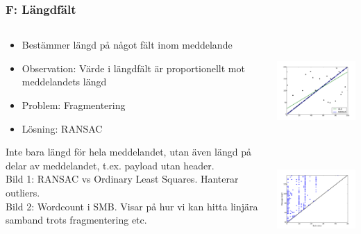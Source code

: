 \documentclass[xetex, 8pt]{beamer}
\begin{document}
    \begin{frame}
        \frametitle{F: Längdfält}
        \begin{columns}[t]
            \begin{column}[T]{6cm}
                \begin{itemize}
                    \item Bestämmer längd på något fält inom meddelande
                    \item Observation: Värde i längdfält är proportionellt
                        mot meddelandets längd
                    \item Problem: Fragmentering
                    \item Lösning: RANSAC
                \end{itemize}
                Inte bara längd för hela meddelandet, utan även längd på delar
                av meddelandet, t.ex. payload utan header.\\
                \vskip20pt
                Bild 1: RANSAC vs Ordinary Least Squares. Hanterar outliers.\\
                \vskip20pt
                Bild 2: Wordcount i SMB. Visar på hur vi kan hitta linjära
                samband trots fragmentering etc.
            \end{column}
            \begin{column}[T]{6cm}
                \includegraphics[height=4cm]{img/ransac.pdf}\\
                \includegraphics[height=4cm]{img/length.pdf}
            \end{column}
        \end{columns}
    \end{frame}
\end{document}
